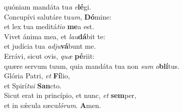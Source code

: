 \oddverse quóniam mandáta tu\textit{a} \textit{e}\textbf{lé}gi.\\
\evenverse Concupívi salutáre tu\textit{um}, \textbf{Dó}mine:~\*\\
\evenverse et lex tua meditá\textit{ti}\textit{o} \textbf{me}a est.\\
\oddverse Vivet ánima mea, et \textit{lau}\textbf{dá}bit te:~\*\\
\oddverse et judícia tua \textit{ad}\textit{ju}\textbf{vá}bunt me.\\
\evenverse Errávi, sicut ovis, \textit{quæ} \textbf{pé}riit:~\*\\
\evenverse quære servum tuum, quia mandáta tua non \textit{sum} \textit{o}\textbf{blí}tus.\\
\oddverse Glória Patri, \textit{et} \textbf{Fí}lio,~\*\\
\oddverse et Spirí\textit{tu}\textit{i} \textbf{San}cto.\\
\evenverse Sicut erat in princípio, et nunc, \textit{et} \textbf{sem}per,~\*\\
\evenverse et in sǽcula sæcu\textit{ló}\textit{rum}. \textbf{A}men.\\
